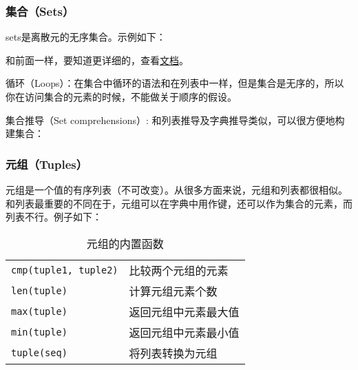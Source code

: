 \subsubsection{集合（Sets）}


sets是离散元的无序集合。示例如下：


和前面一样，要知道更详细的，查看\href{https://docs.python.org/3.5/library/stdtypes.html#set}{文档}。



循环（Loops）：在集合中循环的语法和在列表中一样，但是集合是无序的，所以你在访问集合的元素的时候，不能做关于顺序的假设。



集合推导（Set comprehensions）: 和列表推导及字典推导类似，可以很方便地构建集合：


\subsubsection{元组（Tuples）}


元组是一个值的有序列表（不可改变）。从很多方面来说，元组和列表都很相似。和列表最重要的不同在于，元组可以在字典中用作键，还可以作为集合的元素，而列表不行。例子如下：


\begin{table}[htbp]
  \centering
  \caption{元组的内置函数}
  \begin{tabular}{l|l}\hline
    \lstinline|cmp(tuple1, tuple2)| &比较两个元组的元素\\
    \lstinline|len(tuple)        | &计算元组元素个数\\
    \lstinline|max(tuple)        | &返回元组中元素最大值\\
    \lstinline|min(tuple)        | &返回元组中元素最小值\\
    \lstinline|tuple(seq)   | &将列表转换为元组\\\hline
  \end{tabular}
\end{table}

